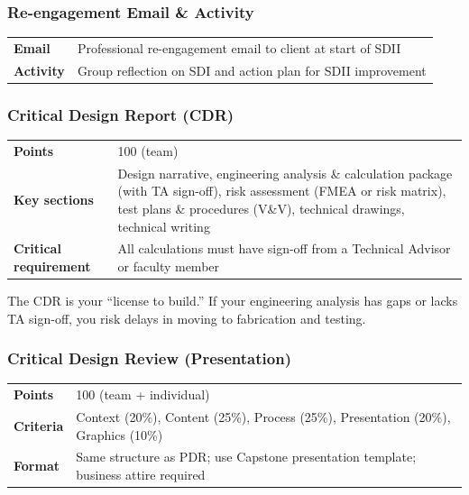 \subsubsection{Re-engagement Email \& Activity}
\label{sssec:reengagement}

\begin{tabularx}{\textwidth}{lX}
\toprule
\textbf{Email} & Professional re-engagement email to client at start of SDII \\
\textbf{Activity} & Group reflection on SDI and action plan for SDII improvement \\
\bottomrule
\end{tabularx}

\subsubsection{Critical Design Report (CDR)}
\label{sssec:cdr-report}

\begin{tabularx}{\textwidth}{lX}
\toprule
\textbf{Points} & 100 (team) \\
\textbf{Key sections} & Design narrative, engineering analysis \& calculation package (with TA sign-off), risk assessment (FMEA or risk matrix), test plans \& procedures (V\&V), technical drawings, technical writing \\
\textbf{Critical requirement} & All calculations must have sign-off from a Technical Advisor or faculty member \\
\bottomrule
\end{tabularx}

\begin{warnbox}
The CDR is your ``license to build.'' If your engineering analysis has gaps or lacks TA sign-off, you risk delays in moving to fabrication and testing.
\end{warnbox}

\subsubsection{Critical Design Review (Presentation)}
\label{sssec:cdr-presentation}

\begin{tabularx}{\textwidth}{lX}
\toprule
\textbf{Points} & 100 (team + individual) \\
\textbf{Criteria} & Context (20\%), Content (25\%), Process (25\%), Presentation (20\%), Graphics (10\%) \\
\textbf{Format} & Same structure as PDR; use Capstone presentation template; business attire required \\
\bottomrule
\end{tabularx}

